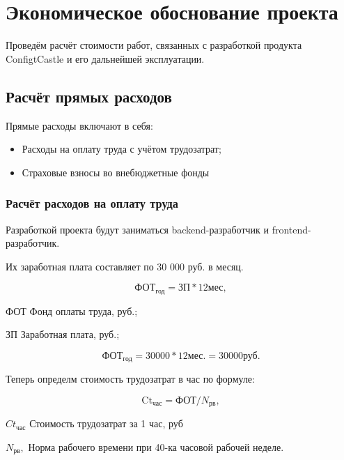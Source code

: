 \section{Экономическое обоснование проекта}

Проведём расчёт стоимости работ, связанных с разработкой
продукта ConfigtCastle и его дальнейшей эксплуатации.

\tocless\subsection{Расчёт прямых расходов}

Прямые расходы включают в себя:
\begin{itemize}
    \item Расходы на оплату труда с учётом трудозатрат;
    \item Страховые взносы во внебюджетные фонды
\end{itemize}

\subsubsection{Расчёт расходов на оплату труда}

Разработкой проекта будут заниматься backend-разработчик и
frontend-разработчик.

Их заработная плата составляет по 30 000 руб. в месяц.

\begin{equation}
   \text{ФОТ}_\text{год} = \text{ЗП} * 12 \text{мес},
\end{equation}

\begin{eqexpl}[25mm]
    \item{ФОТ} Фонд оплаты труда, руб.;
    \item{ЗП} Заработная плата, руб.;
\end{eqexpl}

\begin{equation*}
    \text{ФОТ}_\text{год} = 30 000 * 12 \text{мес.} = 30 000 \text{руб.}
\end{equation*}

Теперь определм стоимость трудозатрат в час по формуле:

\begin{equation}
    \text{Ct}_\text{час} = \text{ФОТ} / N_\text{рв},
\end{equation}

\begin{eqexpl}[25mm]
    \item{$Ct_\text{час}$} Стоимость трудозатрат за 1 час, руб
    \item{$N_\text{рв},$} Норма рабочего времени при 40-ка часовой рабочей
неделе.
\end{eqexpl}

